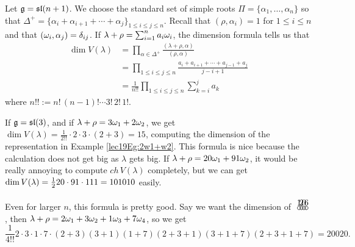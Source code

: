  \begin{example}
   Let $\mathfrak{g} = \mathfrak{sl}(n+1)$. We choose the standard set of
   simple roots $\Pi=\{\alpha_1,\dots, \alpha_n\}$ so that $\Delta^+ =
   \{\alpha_i+\alpha_{i+1}+\cdots+\alpha_j\}_{1\le i\le j\le n}$. Recall that
   $(\rho,\alpha_i)=1$ for $1\le i\le n$ and that $(\omega_i,\alpha_j)=\delta_{ij}$. If
   $\lambda+\rho = \sum_{i=1}^n a_i\omega_i$, the dimension formula tells us that
   \begin{align*}
     \dim V(\lambda) &= \prod_{\alpha\in \Delta^+}
            \frac{(\lambda+\rho,\alpha)}{(\rho,\alpha)}\\
         &= \prod_{1\le i\le j\le n}\frac{a_i+a_{i+1}+\cdots+a_{j-1}+a_j}{j-i+1}\\
         &= \frac{1}{n!!}\prod_{1\le i\le j\le n} \sum_{k=i}^j a_k
   \end{align*}
   where $n!!:= n!\,(n-1)!\cdots 3!\,2!\,1!$.

   If $\mathfrak{g}=\mathfrak{sl}(3)$, and if $\lambda+\rho=3\omega_1+2\omega_2$, we get $\dim V(\lambda) =
   \frac{1}{2!!}\cdot 2\cdot 3\cdot (2+3) =15$, computing the dimension of the
   representation in Example \ref{lec19Eg:2w1+w2}.
   This formula is nice because the calculation does not get big as $\lambda$ gets
   big. If $\lambda+\rho=20\omega_1 + 91\omega_2$, it would be really annoying to compute
   $ch\, V(\lambda)$ completely, but we can get $\dim V(\lambda) = \frac{1}{2}
   20\cdot 91\cdot 111 = 101010$ easily.

   Even for larger $n$, this formula is pretty good. Say we want the dimension of
   $\begin{xy}
    (0,-.15) *+!D{1} *\cir<2pt>{};
    p+(1,0) *+!D{2} *\cir<2pt>{} **@{-};
    p+(1,0) *+!D{0} *\cir<2pt>{} **@{-};
    p+(1,0) *+!D{6} *\cir<2pt>{} **@{-};
  \end{xy}$, then $\lambda+\rho = 2\omega_1+ 3\omega_2+ 1\omega_3+ 7\omega_4$, so we get
  {\small \[\frac{1}{4!!}2\cdot 3\cdot 1\cdot 7\cdot
  (2+3)(3+1)(1+7)(2+3+1)(3+1+7)(2+3+1+7)=20020.\]}
 \end{example}
%
